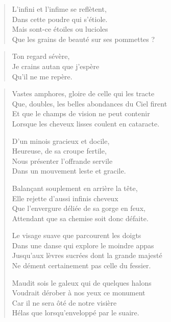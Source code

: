 \begin{verse}
L’infini et l’infime se reflètent,\\
Dans cette poudre qui s’étiole.\\
Mais sont-ce étoiles ou lucioles\\
Que les grains de beauté sur ses pommettes ?
\end{verse}

\begin{verse}
Ton regard sévère,\\
Je crains autan que j’espère\\
Qu’il ne me repère.
\end{verse}

\begin{verse}
Vastes amphores, gloire de celle qui les tracte\\
Que, doubles, les belles abondances du Ciel firent\\
Et que le champs de vision ne peut contenir\\
Lorsque les cheveux lisses coulent en cataracte.

D’un minois gracieux et docile,\\
Heureuse, de sa croupe fertile,\\
Nous présenter l’offrande servile\\
Dans un mouvement leste et gracile.

Balançant souplement en arrière la tête,\\
Elle rejette d’aussi infinis cheveux\\
Que l’envergure déliée de sa gorge en feux,\\
Attendant que sa chemise soit donc défaite.

Le visage suave que parcourent les doigts\\
Dans une danse qui explore le moindre appas\\
Jusqu’aux lèvres sucrées dont la grande majesté\\
Ne dément certainement pas celle du fessier.

Maudit sois le galeux qui de quelques halons\\
Voudrait dérober à nos yeux ce monument\\
Car il ne sera ôté de notre visière\\
Hélas que  lorsqu’enveloppé par le suaire.
\end{verse}

\newpage
\newcommand\nildesc{\em 
}

